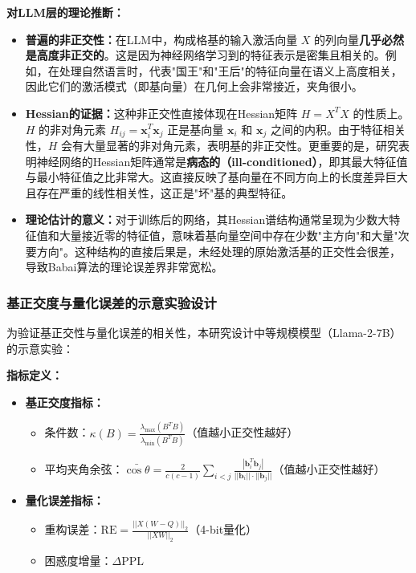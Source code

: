 \documentclass[letterpaper,twocolumn,10pt]{article}
\begin{document}
\textbf{对LLM层的理论推断：}

\begin{itemize}
\item \textbf{普遍的非正交性：}在LLM中，构成格基的输入激活向量 $X$ 的列向量\textbf{几乎必然是高度非正交的}。这是因为神经网络学习到的特征表示是密集且相关的。例如，在处理自然语言时，代表"国王"和"王后"的特征向量在语义上高度相关，因此它们的激活模式（即基向量）在几何上会非常接近，夹角很小。

\item \textbf{Hessian的证据：}这种非正交性直接体现在Hessian矩阵 $H = X^T X$ 的性质上。$H$ 的非对角元素 $H_{ij} = \mathbf{x}_i^T \mathbf{x}_j$ 正是基向量 $\mathbf{x}_i$ 和 $\mathbf{x}_j$ 之间的内积。由于特征相关性，$H$ 会有大量显著的非对角元素，表明基的非正交性。更重要的是，研究表明神经网络的Hessian矩阵通常是\textbf{病态的（ill-conditioned）}，即其最大特征值与最小特征值之比非常大。这直接反映了基向量在不同方向上的长度差异巨大且存在严重的线性相关性，这正是"坏"基的典型特征。

\item \textbf{理论估计的意义：}对于训练后的网络，其Hessian谱结构通常呈现为少数大特征值和大量接近零的特征值，意味着基向量空间中存在少数"主方向"和大量"次要方向"。这种结构的直接后果是，未经处理的原始激活基的正交性会很差，导致Babai算法的理论误差界非常宽松。
\end{itemize}

\subsubsection{基正交度与量化误差的示意实验设计}

为验证基正交性与量化误差的相关性，本研究设计中等规模模型（Llama-2-7B）的示意实验：

\textbf{指标定义：}
\begin{itemize}
\item \textbf{基正交度指标：}
\begin{itemize}
\item 条件数：$\kappa(B) = \frac{\lambda_{\text{max}}(B^T B)}{\lambda_{\text{min}}(B^T B)}$（值越小正交性越好）
\item 平均夹角余弦：$\bar{\cos\theta} = \frac{2}{c(c-1)}\sum_{i<j} \frac{|\mathbf{b}_i^T \mathbf{b}_j|}{||\mathbf{b}_i||\cdot||\mathbf{b}_j||}$（值越小正交性越好）
\end{itemize}
\item \textbf{量化误差指标：}
\begin{itemize}
\item 重构误差：$\text{RE} = \frac{||X(W - Q)||_2}{||XW||_2}$（4-bit量化）
\item 困惑度增量：$\Delta \text{PPL}$
\end{itemize}
\end{itemize}
\end{document}
